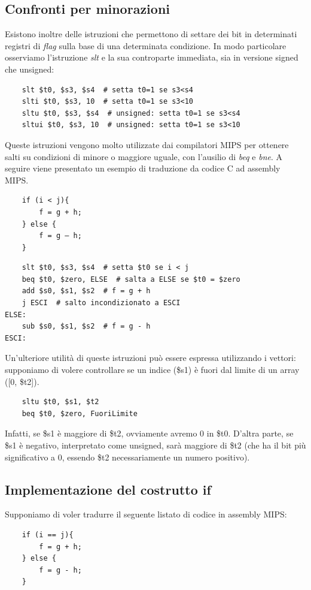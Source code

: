 \documentclass[class=book, crop=false]{standalone}
\begin{document}
\subsection{Confronti per minorazioni}
Esistono inoltre delle istruzioni che permettono di settare dei bit in determinati registri di \emph{flag} sulla base di una determinata condizione. In modo particolare osserviamo l'istruzione \emph{slt} e la sua controparte immediata, sia in versione signed che unsigned:
\begin{verbatim}
	slt $t0, $s3, $s4  # setta t0=1 se s3<s4
	slti $t0, $s3, 10  # setta t0=1 se s3<10
	sltu $t0, $s3, $s4  # unsigned: setta t0=1 se s3<s4
	sltui $t0, $s3, 10  # unsigned: setta t0=1 se s3<10
\end{verbatim}
Queste istruzioni vengono molto utilizzate dai compilatori MIPS per ottenere salti su condizioni di minore o maggiore uguale, con l'ausilio di \emph{beq} e \emph{bne}. A seguire viene presentato un esempio di traduzione da codice C ad assembly MIPS.
\begin{verbatim}
	if (i < j){
		f = g + h;
	} else {
		f = g – h;
	}
\end{verbatim}
\begin{verbatim}
	slt $t0, $s3, $s4  # setta $t0 se i < j
	beq $t0, $zero, ELSE  # salta a ELSE se $t0 = $zero
	add $s0, $s1, $s2  # f = g + h
	j ESCI  # salto incondizionato a ESCI
ELSE:
	sub $s0, $s1, $s2  # f = g - h
ESCI:
\end{verbatim}
Un'ulteriore utilità di queste istruzioni può essere espressa utilizzando i vettori: supponiamo di volere controllare se un indice (\$s1) è fuori dal limite di un array ([0, \$t2]).
\begin{verbatim}
	sltu $t0, $s1, $t2
	beq $t0, $zero, FuoriLimite
\end{verbatim}
Infatti, se \$s1 è maggiore di \$t2, ovviamente avremo 0 in \$t0. D'altra parte, se \$s1 è negativo, interpretato come unsigned, sarà maggiore di \$t2 (che ha il bit più significativo a 0, essendo \$t2 necessariamente un numero positivo).

\subsection{Implementazione del costrutto if}
Supponiamo di voler tradurre il seguente listato di codice in assembly MIPS:
\begin{verbatim}
	if (i == j){
		f = g + h;
	} else {
		f = g - h;
	}
\end{verbatim}
\end{document}
